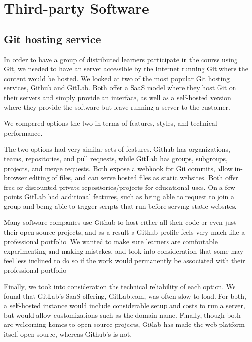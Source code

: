 \documentclass[12pt,twoside,vi]{mitthesis}
\begin{document}
\section{Third-party Software}

\subsection{Git hosting service}

In order to have a group of distributed learners participate in the course using Git, we needed to have an server accessible by the Internet running Git where the content would be hosted. We looked at two of the most popular Git hosting services, Github and GitLab. Both offer a SaaS model where they host Git on their servers and simply provide an interface, as well as a self-hosted version where they provide the software but leave running a server to the customer.

We compared options the two in terms of features, styles, and technical performance.

The two options had very similar sets of features. Github has organizations, teams, repositories, and pull requests, while GitLab has groups, subgroups, projects, and merge requests. Both expose a webhook for Git commits, allow in-browser editing of files, and can serve hosted files as static websites. Both offer free or discounted private repositories/projects for educational uses. On a few points GitLab had additional features, such as being able to request to join a group and being able to trigger scripts that run before serving static websites.

Many software companies use Github to host either all their code or even just their open source projects, and as a result a Github profile feels very much like a professional portfolio. We wanted to make sure learners are comfortable experimenting and making mistakes, and took into consideration that some may feel less inclined to do so if the work would permanently be associated with their professional portfolio. 

Finally, we took into consideration the technical reliability of each option. We found that GitLab's SaaS offering, GitLab.com, was often slow to load. For both, a self-hosted instance would include considerable setup and costs to run a server, but would allow customizations such as the domain name. Finally, though both are welcoming homes to open source projects, Gitlab has made the web platform itself open source, whereas Github's is not.
\end{document}
